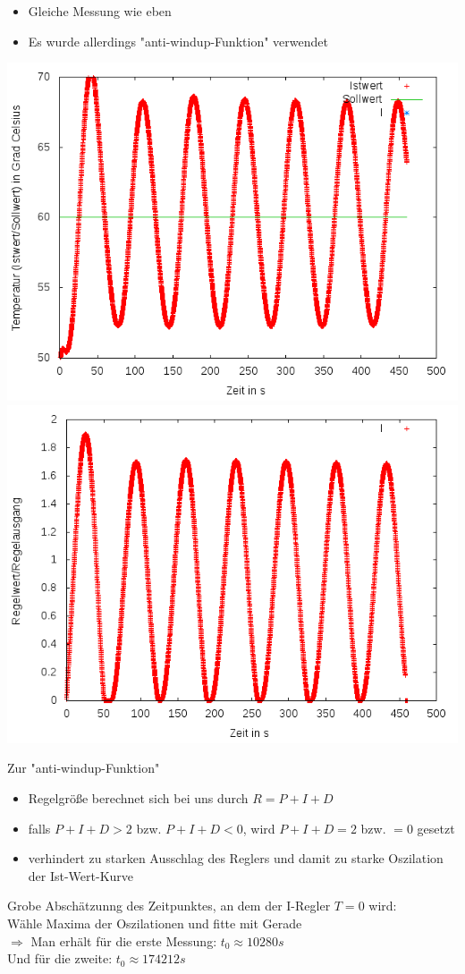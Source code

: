 \documentclass[compress,11pt]{beamer}
\begin{document}
\begin{frame}
\begin{itemize}
\item Gleiche Messung wie eben
\item Es wurde allerdings "anti-windup-Funktion" verwendet
\end{itemize}
\includegraphics[width=.5\textwidth]{../2aufgabe/2c2}
\includegraphics[width=.5\textwidth]{../2aufgabe/2c2_I}
\end{frame}
\begin{frame}
\begin{block}{Zur "anti-windup-Funktion"}
\begin{itemize}
\item Regelgröße berechnet sich bei uns durch $R = P + I + D$
\item falls $P + I + D > 2$ bzw. $P + I + D < 0$, wird $P + I + D = 2$ bzw. $= 0$ gesetzt
\item verhindert zu starken Ausschlag des Reglers und damit zu starke Oszilation der Ist-Wert-Kurve
\end{itemize}
\end{block}
\end{frame}


\begin{frame}
Grobe Abschätzunng des Zeitpunktes, an dem der I-Regler $T = 0$ wird:\\
Wähle Maxima der Oszilationen und fitte mit Gerade\\
$\Rightarrow$ Man erhält für die erste Messung:  $t_0 \approx 10280 s$\\
Und für die zweite:  $t_0 \approx 174212 s$

\end{frame}
\end{document}

